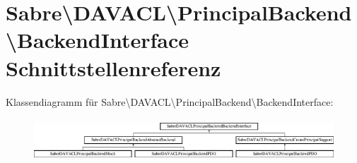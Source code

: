 \hypertarget{interface_sabre_1_1_d_a_v_a_c_l_1_1_principal_backend_1_1_backend_interface}{}\section{Sabre\textbackslash{}D\+A\+V\+A\+CL\textbackslash{}Principal\+Backend\textbackslash{}Backend\+Interface Schnittstellenreferenz}
\label{interface_sabre_1_1_d_a_v_a_c_l_1_1_principal_backend_1_1_backend_interface}
Klassendiagramm für Sabre\textbackslash{}D\+A\+V\+A\+CL\textbackslash{}Principal\+Backend\textbackslash{}Backend\+Interface\+:\begin{figure}[H]
\begin{center}
\leavevmode
\includegraphics[height=1.604584cm]{interface_sabre_1_1_d_a_v_a_c_l_1_1_principal_backend_1_1_backend_interface}
\end{center}
\end{figure}
